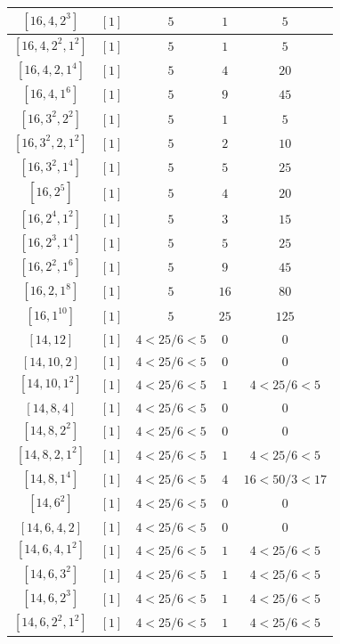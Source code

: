 \documentclass{article}%
\begin{document}
\begin{center}
\begin{longtable}{||c|c|c|c|c||}
$[16, 4, 2^{3}]$ & $[1]$ & $5$ & $1$ & $5$ \\ \hline 
$[16, 4, 2^{2}, 1^{2}]$ & $[1]$ & $5$ & $1$ & $5$ \\ \hline 
$[16, 4, 2, 1^{4}]$ & $[1]$ & $5$ & $4$ & $20$ \\ \hline 
$[16, 4, 1^{6}]$ & $[1]$ & $5$ & $9$ & $45$ \\ \hline 
$[16, 3^{2}, 2^{2}]$ & $[1]$ & $5$ & $1$ & $5$ \\ \hline 
$[16, 3^{2}, 2, 1^{2}]$ & $[1]$ & $5$ & $2$ & $10$ \\ \hline 
$[16, 3^{2}, 1^{4}]$ & $[1]$ & $5$ & $5$ & $25$ \\ \hline 
$[16, 2^{5}]$ & $[1]$ & $5$ & $4$ & $20$ \\ \hline 
$[16, 2^{4}, 1^{2}]$ & $[1]$ & $5$ & $3$ & $15$ \\ \hline 
$[16, 2^{3}, 1^{4}]$ & $[1]$ & $5$ & $5$ & $25$ \\ \hline 
$[16, 2^{2}, 1^{6}]$ & $[1]$ & $5$ & $9$ & $45$ \\ \hline 
$[16, 2, 1^{8}]$ & $[1]$ & $5$ & $16$ & $80$ \\ \hline 
$[16, 1^{10}]$ & $[1]$ & $5$ & $25$ & $125$ \\ \hline 
$[14, 12]$ & $[1]$ & $4 < 25/6 < 5$ & $0$ & $0$ \\ \hline 
$[14, 10, 2]$ & $[1]$ & $4 < 25/6 < 5$ & $0$ & $0$ \\ \hline 
$[14, 10, 1^{2}]$ & $[1]$ & $4 < 25/6 < 5$ & $1$ & $4 < 25/6 < 5$ \\ \hline 
$[14, 8, 4]$ & $[1]$ & $4 < 25/6 < 5$ & $0$ & $0$ \\ \hline 
$[14, 8, 2^{2}]$ & $[1]$ & $4 < 25/6 < 5$ & $0$ & $0$ \\ \hline 
$[14, 8, 2, 1^{2}]$ & $[1]$ & $4 < 25/6 < 5$ & $1$ & $4 < 25/6 < 5$ \\ \hline 
$[14, 8, 1^{4}]$ & $[1]$ & $4 < 25/6 < 5$ & $4$ & $16 < 50/3 < 17$ \\ \hline 
$[14, 6^{2}]$ & $[1]$ & $4 < 25/6 < 5$ & $0$ & $0$ \\ \hline 
$[14, 6, 4, 2]$ & $[1]$ & $4 < 25/6 < 5$ & $0$ & $0$ \\ \hline 
$[14, 6, 4, 1^{2}]$ & $[1]$ & $4 < 25/6 < 5$ & $1$ & $4 < 25/6 < 5$ \\ \hline 
$[14, 6, 3^{2}]$ & $[1]$ & $4 < 25/6 < 5$ & $1$ & $4 < 25/6 < 5$ \\ \hline 
$[14, 6, 2^{3}]$ & $[1]$ & $4 < 25/6 < 5$ & $1$ & $4 < 25/6 < 5$ \\ \hline 
$[14, 6, 2^{2}, 1^{2}]$ & $[1]$ & $4 < 25/6 < 5$ & $1$ & $4 < 25/6 < 5$ \\ \hline 

\end{longtable}
\end{center}
\end{document}
